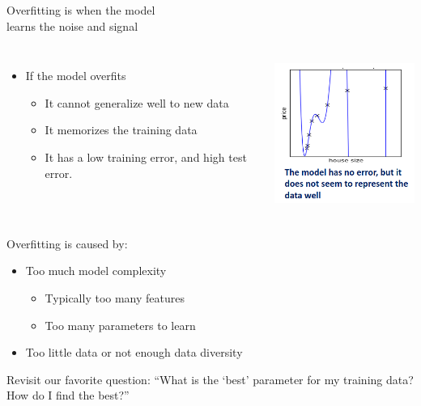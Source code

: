 \documentclass[aspectratio=169,14pt,usenames,dvipsnames]{beamer}
\begin{document}
\begin{frame}{Overfitting is when the model \\ learns the noise and signal}
\begin{columns}
\begin{itemize}
\item If the model overfits
\begin{itemize}
\item It cannot \alert{generalize} well to new data
\item It \alert{memorizes} the training data
\item It has a \alert{low training error}, and \alert{high test error.}
\end{itemize}
\end{itemize}


\includegraphics[width=5cm, height=5cm]{Images/AIML_OFG_16.png}
\end{columns}
\end{frame}


\begin{frame}{Overfitting is caused by:}
\begin{itemize}
\item Too much model complexity
\begin{itemize}
\item Typically too many features
\item Too many parameters to learn
\end{itemize}
\item Too little data or not enough data diversity
\end{itemize}
\end{frame}


\begin{frame}{Revisit our favorite question:}
\centering
“What is the ‘best’ parameter for my training data? How do I find the best?”

\end{frame}
\end{document}
